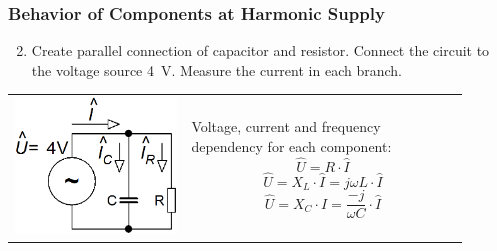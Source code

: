 \documentclass{beamer}
\begin{document}
	\begin{frame}
    \frametitle{Behavior of Components at Harmonic Supply}
		\begin{enumerate}
			\setcounter{enumi}{1}
			\item Create parallel connection of capacitor and resistor. Connect the circuit to the voltage source 4~V. Measure the current in each branch.
		\end{enumerate}
		
		\begin{center}
			\begin{tabular}{m{0.35\linewidth} m{0.55\linewidth}}
			\includegraphics[scale=0.25]{obr03_RCobvod.png} &
			Voltage, current and frequency dependency for each component:
			$$\hat{U}=R \cdot \hat{I}$$
			$$\hat{U}=X_L \cdot \hat{I} = j\omega L \cdot\hat{I}$$
			$$\hat{U}=X_C \cdot \hat{I} = \frac{-j}{\omega C}\cdot\hat{I}$$
			\end{tabular}
		\end{center}
	\end{frame}
\end{document}
